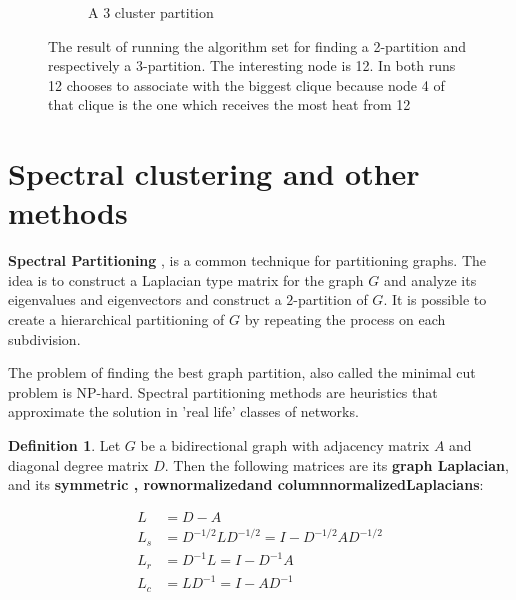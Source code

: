 \documentclass[a4paper,10pt]{article}
\theoremstyle{definition}
\newtheorem{mydef}{Definition}[section]
\theoremstyle{remark}
\theoremstyle{plain}
\begin{document}
\begin{figure}
\begin{subfigure}[b]{0.5\textwidth}
\caption{A 3 cluster partition}
\label{fig:examplecoolwarm3cluster}
\end{subfigure}
\caption{The result of running the algorithm set for finding a 2-partition and
respectively a 3-partition. The interesting node is 12. In both runs 12 chooses
to associate with the biggest clique because node 4 of that clique is the one
which receives the most heat from 12}
\label{fig:exampleCoolWarmClustering}
\end{figure}



\section{Spectral clustering and other methods}

\textbf{Spectral Partitioning} 
\cite{von2007tutorial, naumov2016parallel, WikipediaGraphPartition, WikipediaSpectralClustering},
is a common technique for partitioning graphs. The idea is to construct a
Laplacian type matrix \cite{WikipediaLaplacianMatrix} for the graph $G$ and
analyze its eigenvalues and eigenvectors and construct a $2$-partition of $G$.
It is possible to create a hierarchical partitioning of $G$ by repeating the
process on each subdivision.

The problem of finding the best graph partition, also called the minimal cut
problem is NP-hard. Spectral partitioning methods are heuristics that
approximate the solution in 'real life' classes of networks.

\begin{mydef}
\label{def:Laplacian}
Let $G$ be a bidirectional graph with adjacency matrix $A$ and diagonal degree
matrix $D$.
Then the following matrices are its \textbf{graph Laplacian}, and its
\textbf{symmetric\textemdash
, row\textendash normalized\textemdash and column\textendash normalized\textemdash Laplacians}:  

\begin{equation}
\begin{aligned}
L & = D - A \\
L_s & = D^{-1/2}LD^{-1/2} = I - D^{-1/2}AD^{-1/2} \\
L_r & = D^{-1}L = I - D^{-1}A \\
L_c & = LD^{-1} = I - AD^{-1}
\end{aligned}
\end{equation}
\end{mydef}
\end{document}
